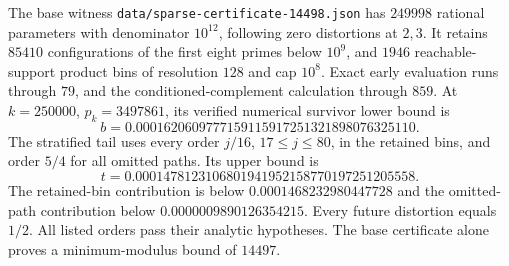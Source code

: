\documentclass[11pt]{article}
\begin{document}
The base witness \texttt{data/sparse-certificate-14498.json} has $249998$
rational parameters with denominator $10^{12}$, following zero distortions
at $2,3$. It retains $85410$ configurations of the first eight primes below
$10^9$, and $1946$ reachable-support product bins of resolution $128$
and cap $10^8$. Exact early evaluation runs through $79$, and the
conditioned-complement calculation through $859$. At $k=250000$,
$p_k=3497861$, its verified numerical survivor lower bound is
\[
 b=0.0001620609777159115917251321898076325110.
\]
The stratified tail uses every order $j/16$, $17\leq j\leq80$, in the
retained bins, and order $5/4$ for all omitted paths. Its upper bound is
\[
 t=0.0001478123106801941952158770197251205558.
\]
The retained-bin contribution is below $0.0001468232980447728$ and the
omitted-path contribution below $0.0000009890126354215$. Every future
distortion equals $1/2$. All listed orders pass their analytic hypotheses.
The base certificate alone proves a minimum-modulus bound of $14497$.
\end{document}
